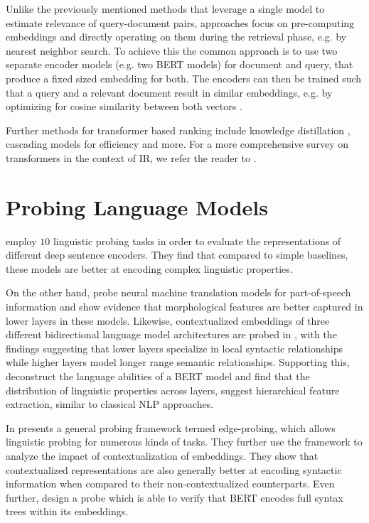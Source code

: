Unlike the previously mentioned methods that leverage a single model to estimate relevance of query-document pairs,  approaches focus on pre-computing embeddings and directly operating on them during the retrieval phase, e.g. by nearest neighbor search. To achieve this the common approach is to use two separate encoder models (e.g. two BERT models) for document and query, that produce a fixed sized embedding for both. The encoders can then be trained such that a query and a relevant document result in similar embeddings, e.g. by optimizing for cosine similarity between both vectors \cite{Humeau2020Poly-encoders, 10.1145/3397271.3401075, DBLP:journals/corr/abs-1908-10084}.

Further methods for transformer based ranking include knowledge distillation \cite{DBLP:journals/corr/abs-2009-07531, DBLP:journals/corr/abs-2010-02666}, cascading models for efficiency \cite{Nogueira2019MultiStageDR} and more. For a more comprehensive survey on transformers in the context of IR, we refer the reader to \cite{10.1145/3437963.3441667}.

\section{Probing Language Models}
\cite{conneau-etal-2018-cram} employ $10$ linguistic probing tasks in order to evaluate the representations of different deep sentence encoders. They find that compared to simple baselines, these models are better at encoding complex linguistic properties.

On the other hand, \cite{Belinkov2017WhatDN} probe neural machine translation models for part-of-speech information and show evidence that morphological features are better captured in lower layers in these models. Likewise, contextualized embeddings of three different bidirectional language model architectures are probed in \cite{peters-etal-2018-dissecting}, with the findings suggesting that lower layers specialize in local syntactic relationships while higher layers model longer range semantic relationships. Supporting this, \cite{tenney-etal-2019-bert} deconstruct the language abilities of a BERT model and find that the distribution of linguistic properties across layers, suggest hierarchical feature extraction, similar to classical NLP approaches.

In \cite{Tenney2019WhatDY} presents a general probing framework termed edge-probing, which allows linguistic probing for numerous kinds of tasks. They further use the framework to analyze the impact of contextualization of embeddings. They show that contextualized representations are also generally better at encoding syntactic information when compared to their non-contextualized counterparts. Even further, \cite{Hewitt2019ASP} design a probe which is able to verify that BERT encodes full syntax trees within its embeddings.



